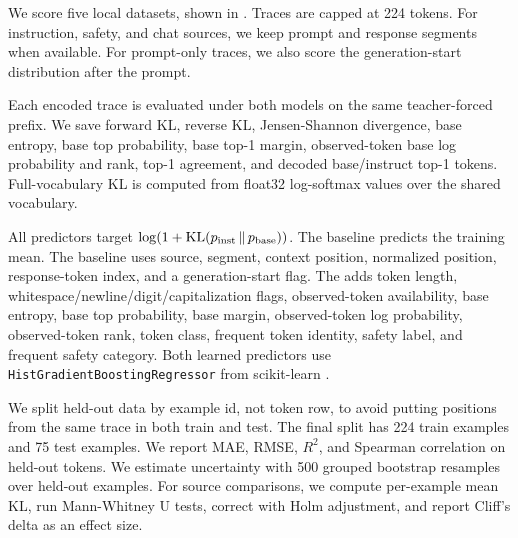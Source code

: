 We score five local datasets, shown in . Traces are capped at 224 tokens. For instruction, safety, and chat sources, we keep prompt and response segments when available. For prompt-only \justeval traces, we also score the generation-start distribution after the prompt.



Each encoded trace is evaluated under both models on the same teacher-forced prefix. We save forward KL, reverse KL, Jensen-Shannon divergence, base entropy, base top probability, base top-1 margin, observed-token base log probability and rank, top-1 agreement, and decoded base/instruct top-1 tokens. Full-vocabulary KL is computed from float32 log-softmax values over the shared vocabulary.

All predictors target $\log(1+\mathrm{KL}\!\left(p_{\mathrm{inst}}\,\Vert\,p_{\mathrm{base}}\right))$. The \meanbaseline baseline predicts the training mean. The \possource baseline uses source, segment, context position, normalized position, response-token index, and a generation-start flag. The \richpredictor adds token length, whitespace/newline/digit/capitalization flags, observed-token availability, base entropy, base top probability, base margin, observed-token log probability, observed-token rank, token class, frequent token identity, safety label, and frequent safety category. Both learned predictors use \texttt{HistGradientBoostingRegressor} from scikit-learn \citep{pedregosa2011scikit}.

We split held-out data by example id, not token row, to avoid putting positions from the same trace in both train and test. The final split has 224 train examples and 75 test examples. We report MAE, RMSE, $R^2$, and Spearman correlation on held-out tokens. We estimate uncertainty with 500 grouped bootstrap resamples over held-out examples. For source comparisons, we compute per-example mean KL, run Mann-Whitney U tests, correct with Holm adjustment, and report Cliff's delta as an effect size.
